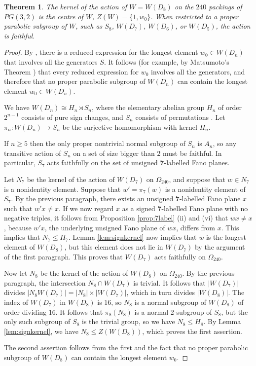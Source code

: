 \documentclass{amsart}
\theoremstyle{plain}
\newtheorem{theorem}{Theorem}[section]
\theoremstyle{definition}
\theoremstyle{remark}
\numberwithin{equation}{section}
\newcommand{\ra}{\rightarrow}
\newcommand{\seven}{{\mathbf 7}}
\newcommand{\qpx}{\Omega_{240}}
\begin{document}
\begin{theorem}\label{thm:faithful}
The kernel of the action of $W = W(D_8)$ on the $240$ packings of $PG(3, 2)$ is the centre of $W$, $Z(W) = \{1, w_0\}$.
When restricted to a proper parabolic subgroup of $W$, such as $S_8$, $W(D_7)$, $W(D_6)$, or $W(D_5)$, the 
action is faithful.
\end{theorem}

\begin{proof}
By \cite[\S3.19]{humphreys90}, there is a reduced expression for the longest element $w_0 \in W(D_n)$ that involves
all the generators $S$. It follows (for example, by Matsumoto's Theorem \cite[Theorem 3.3.1]{geck00}) that every
reduced expression for $w_0$ involves all the generators, and therefore that no proper parabolic subgroup of
$W(D_n)$ can contain the longest element $w_0 \in W(D_n)$.

We have $W(D_n) \cong H_n \rtimes S_n$, where the elementary abelian group $H_n$ of order $2^{n-1}$ consists of
pure sign changes, and $S_n$ consists of permutations \cite[\S2]{humphreys90}. Let $\pi_n : W(D_n) \ra S_n$ be 
the surjective homomorphism with kernel $H_n$.

If $n \geq 5$ then the only proper nontrivial normal subgroup of $S_n$ is $A_n$, so any transitive action of
$S_n$ on a set of size bigger than $2$ must be faithful. In particular, $S_7$ acts faithfully on the set of
unsigned $\seven$-labelled Fano planes. 

Let $N_7$ be the kernel of the action of $W(D_7)$ on $\qpx$, and suppose that $w \in N_7$ is a nonidentity
element. Suppose that $w' = \pi_7(w)$ is a nonidentity element of $S_7$. By the previous paragraph, there exists
an unsigned $\seven$-labelled Fano plane $x$ such that $w' x \ne x$. If we now regard $x$ as a signed 
$\seven$-labelled Fano plane with no negative triples, it follows from Proposition \ref{prop:7label} (ii) and
(vi) that $w x \ne x$, because $w' x$, the underlying unsigned Fano plane of $w x$, differs from $x$. This implies 
that $N_7 \leq H_7$. Lemma \ref{lem:signkernel} now implies that $w$ is the longest element of $W(D_8)$, but this 
element does not lie in $W(D_7)$ by the argument of the first paragraph. This proves that $W(D_7)$ acts faithfully 
on $\qpx$.

Now let $N_8$ be the kernel of the action of $W(D_8)$ on $\qpx$. By the previous paragraph, the intersection
$N_8 \cap W(D_7)$ is trivial. It follows that $|W(D_7)|$ divides $|N_8 W(D_7)| = |N_8| \times |W(D_7)|$, which in 
turn divides $|W(D_8)|$. The index of $W(D_7)$ in $W(D_8)$ is $16$, so $N_8$ is a normal subgroup of $W(D_8)$ of
order dividing $16$. It follows that $\pi_8(N_8)$ is a normal $2$-subgroup of $S_8$, but the only such subgroup
of $S_8$ is the trivial group, so we have $N_8 \leq H_8$. By Lemma \ref{lem:signkernel}, we have 
$N_8 \leq Z(W(D_8))$, which proves the first assertion.

The second assertion follows from the first and the fact that no proper parabolic subgroup of $W(D_8)$ can contain
the longest element $w_0$.
\end{proof}
\end{document}
